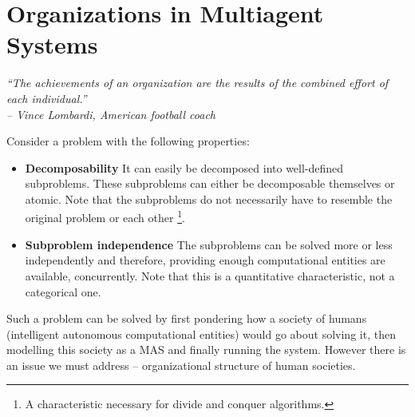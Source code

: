 
\chapter{Organizations in Multiagent Systems}

\begin{flushright}
\textit{``The achievements of an organization are the results of the combined effort of each individual.''}\\
\textit{-- Vince Lombardi, American football coach}
\end{flushright}

Consider a problem with the following properties:
\begin{itemize}
	\item \textbf{Decomposability} It can easily be decomposed into well-defined subproblems. These subproblems can either be decomposable themselves or atomic.
	Note that the subproblems do not necessarily have to resemble the original problem or each other
	\footnote{A characteristic necessary for divide and conquer algorithms.}. 
	\item \textbf{Subproblem independence} The subproblems can be solved more or less independently and therefore, providing enough computational entities are available, concurrently.
	Note that this is a quantitative characteristic, not a categorical one.
\end{itemize}

Such a problem can be solved by first pondering how a society of humans (intelligent autonomous computational entities) would go about solving it, then modelling this society as a MAS and finally running the system.
However there is an issue we must address -- organizational structure of human societies.

